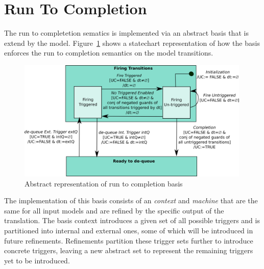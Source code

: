 

\section{Run To Completion}

The run to completetion sematics is implemented via an abstract basis that is extend by the model. 
Figure~\ref{fig:basis} shows a statechart representation of how the basis enforces 
the run to completion semantics on the model transitions. 
\begin{figure}[!h]
	\vspace{-.4cm}
	\centering
	\includegraphics[width=0.99\textwidth]{figures/basis.png}
	\caption{Abstract representation of run to completion basis}
	\label{fig:basis}
	\vspace{-.4cm}
\end{figure}

The implementation of this basis consists of an \EVENTB \emph{context} and \emph{machine} that are 
the same for all input models and are refined by the specific output of the translation.  
The basis context introduces a given set of all 
possible triggers and is partitioned into internal and external ones, 
some of which will be introduced in future refinements. 
Refinements partition these trigger sets further to introduce concrete triggers, 
leaving a new abstract set to represent the remaining triggers yet to be introduced. 


